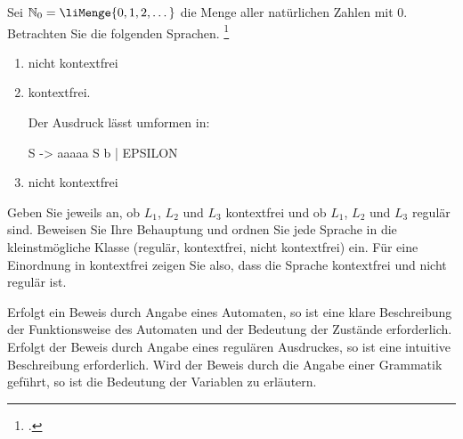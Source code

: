 \documentclass{lehramt-informatik-aufgabe}
\begin{document}

\let\m=\liMenge
\def\l#1{$L_#1$}

Sei $\mathbb{N}_0 = \m{0,1,2,\dots}$ die Menge aller natürlichen Zahlen
mit $0$. Betrachten Sie die folgenden Sprachen.
\footcite{examen:46115:2021:03}
\begin{enumerate}


\item {}

\begin{liAntwort}
nicht kontextfrei
\end{liAntwort}


\item {}

\begin{liAntwort}
kontextfrei.

Der Ausdruck lässt umformen in: 

\begin{liProduktionsRegeln}
S -> aaaaa S b | EPSILON
\end{liProduktionsRegeln}
\end{liAntwort}


\item {}

\begin{liAntwort}
nicht kontextfrei
\end{liAntwort}

\end{enumerate}

\noindent
Geben Sie jeweils an, ob \l1, \l2 und \l3 kontextfrei und ob \l1, \l2
und \l3 regulär sind. Beweisen Sie Ihre Behauptung und ordnen Sie jede
Sprache in die kleinstmögliche Klasse (regulär, kontextfrei, nicht
kontextfrei) ein. Für eine Einordnung in kontextfrei zeigen Sie also,
dass die Sprache kontextfrei und nicht regulär ist.

Erfolgt ein Beweis durch Angabe eines Automaten, so ist eine klare
Beschreibung der Funktionsweise des Automaten und der Bedeutung der
Zustände erforderlich. Erfolgt der Beweis durch Angabe eines regulären
Ausdruckes, so ist eine intuitive Beschreibung erforderlich. Wird der
Beweis durch die Angabe einer Grammatik geführt, so ist die Bedeutung
der Variablen zu erläutern.
\end{document}
